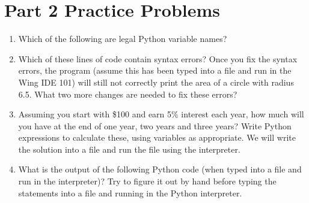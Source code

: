 \documentclass[letterpaper,10pt,english]{sphinxmanual}
\begin{document}
\section{Part 2 Practice Problems}
\label{\detokenize{lecture_notes/lec02_calculator:part-2-practice-problems}}\begin{enumerate}
\def\theenumi{\arabic{enumi}}
\def\labelenumi{\theenumi .}
\makeatletter\def\p@enumii{\p@enumi \theenumi .}\makeatother
\item {} 
Which of the following are legal Python variable names?

\begin{sphinxVerbatim}[commandchars=\\\{\}]
 
\end{sphinxVerbatim}

\item {} 
Which of these lines of code contain syntax errors? Once you fix
the syntax errors, the program (assume this has been typed into a
file and run in the Wing IDE 101) will still not correctly print the
area of a circle with radius 6.5.  What two more changes are needed
to fix these errors?

\begin{sphinxVerbatim}[commandchars=\\\{\}]
    
      
  
    
\end{sphinxVerbatim}

\item {} 
Assuming you start with \$100 and earn 5\% interest each year, how
much will you have at the end of one year, two years and three years?
Write Python expressions to calculate these, using variables as
appropriate.  We will write the solution into a file
and run the file using the interpreter.

\item {} 
What is the output of the following Python code (when typed into a
file and run in the interpreter)? Try to figure it out by hand
before typing the statements into a file and running in the Python
interpreter.


\end{enumerate}
\end{document}
